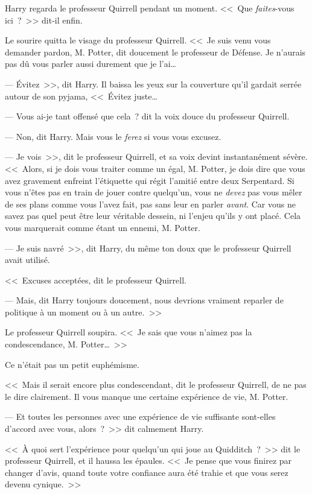 Harry regarda le professeur Quirrell pendant un moment. <<~Que \emph{faites}-vous ici~?~>> dit-il enfin.

Le sourire quitta le visage du professeur Quirrell. <<~Je suis venu vous demander pardon, M. Potter, dit doucement le professeur de Défense. Je n'aurais pas dû vous parler aussi durement que je l'ai…

--- Évitez~>>, dit Harry. Il baissa les yeux sur la couverture qu'il gardait serrée autour de son pyjama, <<~Évitez juste…

--- Vous ai-je tant offensé que cela~? dit la voix douce du professeur Quirrell.

--- Non, dit Harry. Mais vous le \emph{ferez} si vous vous excusez.

--- Je vois~>>, dit le professeur Quirrell, et sa voix devint instantanément sévère. <<~Alors, si je dois vous traiter comme un égal, M. Potter, je dois dire que vous avez gravement enfreint l'étiquette qui régit l'amitié entre deux Serpentard. Si vous n'êtes pas en train de jouer contre quelqu'un, vous ne \emph{devez} pas vous mêler de ses plans comme vous l'avez fait, pas sans leur en parler \emph{avant}. Car vous ne savez pas quel peut être leur véritable dessein, ni l'enjeu qu'ils y ont placé. Cela vous marquerait comme étant un ennemi, M. Potter.

--- Je suis navré~>>, dit Harry, du même ton doux que le professeur Quirrell avait utilisé.

<<~Excuses acceptées, dit le professeur Quirrell.

--- Mais, dit Harry toujours doucement, nous devrions vraiment reparler de politique à un moment ou à un autre.~>>

Le professeur Quirrell soupira. <<~Je sais que vous n'aimez pas la condescendance, M. Potter…~>>

Ce n'était pas un petit euphémisme.

<<~Mais il serait encore plus condescendant, dit le professeur Quirrell, de ne pas le dire clairement. Il vous manque une certaine expérience de vie, M. Potter.

--- Et toutes les personnes avec une expérience de vie suffisante sont-elles d'accord avec vous, alors~?~>> dit calmement Harry.

<<~À quoi sert l'expérience pour quelqu'un qui joue au Quidditch~?~>> dit le professeur Quirrell, et il haussa les épaules. <<~Je pense que vous finirez par changer d'avis, quand toute votre confiance aura été trahie et que vous serez devenu cynique.~>>

